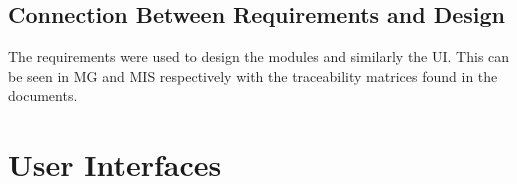 \documentclass[12pt, titlepage]{article}
\begin{document}
\subsection{Connection Between Requirements and Design} \label{SecConnection}

The requirements were used to design the modules and similarly the UI. This can be seen in MG 
and MIS respectively with the traceability matrices found in the documents. 

\newpage

\section{User Interfaces}
\end{document}
